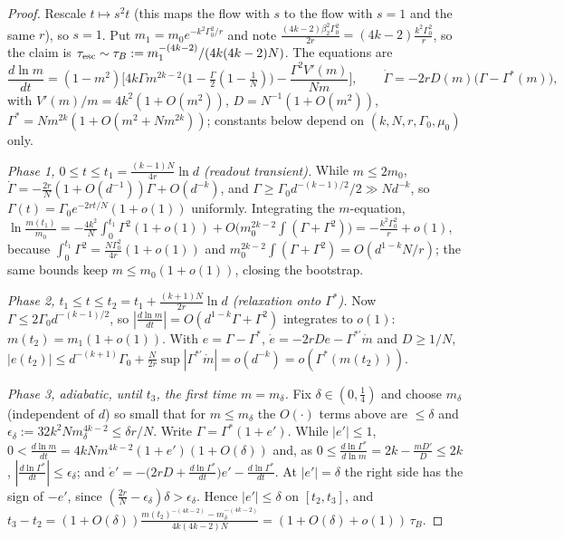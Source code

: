 \begin{proof}
Rescale $t\mapsto s^2t$ (this maps the flow with $s$ to the flow with $s=1$ and the same $r$), so $s=1$. Put $m_1=m_0e^{-k^2\Gamma_0^2/r}$ and note
$\frac{(4k-2)\beta_2^2\Gamma_0^2}{2r}=(4k-2)\frac{k^2\Gamma_0^2}r$, so the claim is $\tau_{\rm esc}\sim\tau_B:=m_1^{-(4k-2)}/(4k(4k-2)N)$. The equations are
\[
\frac{d\ln m}{dt}=(1-m^2)\Big[4k\Gamma m^{2k-2}\big(1-\tfrac\Gamma2(1-\tfrac1N)\big)-\frac{\Gamma^2V'(m)}{Nm}\Big],\qquad \dot\Gamma=-2rD(m)\big(\Gamma-\Gamma^*(m)\big),
\]
with $V'(m)/m=4k^2(1+O(m^2))$, $D=N^{-1}(1+O(m^2))$, $\Gamma^*=Nm^{2k}(1+O(m^2+Nm^{2k}))$; constants below depend on $(k,N,r,\Gamma_0,\mu_0)$ only.

\emph{Phase 1, $0\le t\le t_1=\frac{(k-1)N}{4r}\ln d$ (readout transient).} While $m\le2m_0$, $\dot\Gamma=-\frac{2r}N(1+O(d^{-1}))\Gamma+O(d^{-k})$, and
$\Gamma\ge\Gamma_0d^{-(k-1)/2}/2\gg Nd^{-k}$, so $\Gamma(t)=\Gamma_0e^{-2rt/N}(1+o(1))$ uniformly. Integrating the $m$-equation,
$\ln\frac{m(t_1)}{m_0}=-\frac{4k^2}N\int_0^{t_1}\!\Gamma^2(1+o(1))+O\big(m_0^{2k-2}\!\int(\Gamma+\Gamma^2)\big)=-\frac{k^2\Gamma_0^2}r+o(1)$, because
$\int_0^{t_1}\Gamma^2=\frac{N\Gamma_0^2}{4r}(1+o(1))$ and $m_0^{2k-2}\int(\Gamma+\Gamma^2)=O(d^{1-k}N/r)$; the same bounds keep $m\le m_0(1+o(1))$, closing the bootstrap.

\emph{Phase 2, $t_1\le t\le t_2=t_1+\frac{(k+1)N}{2r}\ln d$ (relaxation onto $\Gamma^*$).} Now $\Gamma\le2\Gamma_0d^{-(k-1)/2}$, so
$|\frac{d\ln m}{dt}|=O(d^{1-k}\Gamma+\Gamma^2)$ integrates to $o(1)$: $m(t_2)=m_1(1+o(1))$. With $e=\Gamma-\Gamma^*$, $\dot e=-2rDe-\Gamma^{*\prime}\dot m$ and $D\ge1/N$,
$|e(t_2)|\le d^{-(k+1)}\Gamma_0+\frac N{2r}\sup|\Gamma^{*\prime}\dot m|=o(d^{-k})=o(\Gamma^*(m(t_2)))$.

\emph{Phase 3, adiabatic, until $t_3$, the first time $m=m_\delta$.} Fix $\delta\in(0,\frac14)$ and choose $m_\delta$ (independent of $d$) so small that
for $m\le m_\delta$ the $O(\cdot)$ terms above are $\le\delta$ and $\epsilon_\delta:=32k^2Nm_\delta^{4k-2}\le\delta r/N$. Write $\Gamma=\Gamma^*(1+e')$. While
$|e'|\le1$, $0<\frac{d\ln m}{dt}=4kNm^{4k-2}(1+e')(1+O(\delta))$ and, as $0\le\frac{d\ln\Gamma^*}{d\ln m}=2k-\frac{mD'}D\le2k$, $|\frac{d\ln\Gamma^*}{dt}|\le\epsilon_\delta$;
and $\dot e'=-\big(2rD+\frac{d\ln\Gamma^*}{dt}\big)e'-\frac{d\ln\Gamma^*}{dt}$. At $|e'|=\delta$ the right side has the sign of $-e'$, since
$(\frac{2r}N-\epsilon_\delta)\delta>\epsilon_\delta$. Hence $|e'|\le\delta$ on $[t_2,t_3]$, and
$t_3-t_2=(1+O(\delta))\frac{m(t_2)^{-(4k-2)}-m_\delta^{-(4k-2)}}{4k(4k-2)N}=(1+O(\delta)+o(1))\,\tau_B$.


\end{proof}
